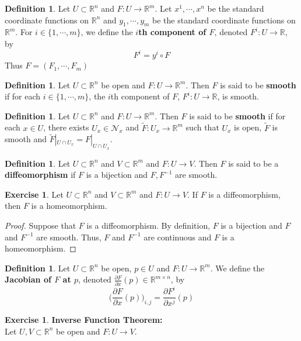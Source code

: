 \documentclass{book}
\theoremstyle{definition}
\newtheorem{defn}[definition]{Definition}
\newtheorem{ex}[definition]{Exercise}
\newcommand{\R}{\mathbb{R}}
\newcommand{\MN}{\mathcal{N}}
\newcommand{\tF}{\tilde{F}}
\DeclareMathOperator*{\0}{\mbf{0}}
\DeclareMathOperator*{\1}{\mbf{1}}
\newcommand{\tbf}[1]{\textbf{#1}}
\newcommand{\p}{\partial}
\begin{document}
	\begin{defn}
	Let $U \subset \R^n$ and $F: U \rightarrow \R^m$. Let $x^1, \cdots, x^n$ be the standard coordinate functions on $\R^n$ and $y_1, \cdots, y_m$ be the standard coordinate functions on $\R^m$. For $i \in \{1, \cdots, m\}$, we define the \tbf{$i$th component of $F$}, denoted $F^i: U \rightarrow \R$, by $$F^i = y^i \circ F$$ 
	Thus $F = (F_1, \cdots, F_m)$
	\end{defn}
	
	\begin{defn}
	Let $U \subset \R^n$ be open and $F: U \rightarrow \R^m$. Then $F$ is said to be \tbf{smooth} if for each $i \in \{1, \cdots, m\}$, the $i$th component of $F$, $F^i: U \rightarrow \R$, is smooth.
	\end{defn}

	\begin{defn}
		Let $U \subset \R^n$ and $F: U \rightarrow \R^m$. Then $F$ is said to be \tbf{smooth} if for each $x \in U$, there exists $U_x \in \MN_x$ and $\tF : U_x \rightarrow \R^m$ such that $U_x$ is open, $\tF$ is smooth and $\tF|_{U \cap U_x} = F|_{U \cap U_x}$.
	\end{defn}

	\begin{defn}
		Let $U \subset \R^n$ and $V \subset \R^m$ and $F: U \rightarrow V$. Then $F$ is said to be a  \tbf{diffeomorphism} if $F$ is a bijection and $F, F^{-1}$ are smooth. 
	\end{defn}
	
	\begin{ex}
	Let $U \subset \R^n$ and $V \subset \R^m$ and $F: U \rightarrow V$. If $F$ is a diffeomorphism, then $F$ is a homeomorphism.
	\end{ex}
	
	\begin{proof}
	Suppose that $F$ is a diffeomorphism. By definition, $F$ is a bijection and $F$ and $F^{-1}$ are smooth. Thus, $F$ and $F^{-1}$ are continuous and $F$ is a homeomorphism.
	\end{proof}
	
	\begin{defn}
	Let $U \subset \R^n$ be open, $p \in U$ and $F: U \rightarrow \R^m$. We define the \tbf{Jacobian of $F$ at $p$}, denoted $\frac{\p F}{\p x}(p) \in \R^{m \times n}$, by $$\bigg (\frac{\p F}{\p x}(p) \bigg )_{i,j} = \frac{\p F^i}{\p x^j}(p)$$
	\end{defn}
	
	\begin{ex}\tbf{Inverse Function Theorem:}\\
	Let $U,V \subset \R^n$ be open and $F: U \rightarrow V$.
	\end{ex}
	
\end{document}
